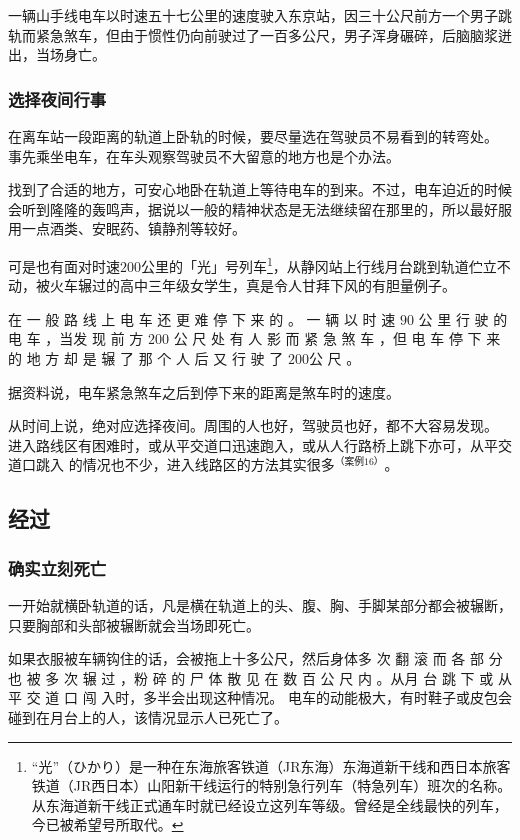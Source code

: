 \documentclass[UTF8]{ctexart}
\begin{document}
一辆山手线电车以时速五十七公里的速度驶入东京站，因三十公尺前方一个男子跳轨而紧急煞车，但由于惯性仍向前驶过了一百多公尺，男子浑身碾碎，后脑脑浆迸出，当场身亡。

\subsubsection*{选择夜间行事}

在离车站一段距离的轨道上卧轨的时候，要尽量选在驾驶员不易看到的转弯处。
事先乘坐电车，在车头观察驾驶员不大留意的地方也是个办法。

找到了合适的地方，可安心地卧在轨道上等待电车的到来。不过，电车迫近的时候会听到隆隆的轰鸣声，据说以一般的精神状态是无法继续留在那里的，所以最好服用一点酒类、安眠药、镇静剂等较好。

可是也有面对时速$200$公里的「光」号列车\footnote{“光”（ひかり）是一种在东海旅客铁道（JR东海）东海道新干线和西日本旅客铁道（JR西日本）山阳新干线运行的特别急行列车（特急列车）班次的名称。从东海道新干线正式通车时就已经设立这列车等级。曾经是全线最快的列车，今已被希望号所取代。}，从静冈站上行线月台跳到轨道伫立不动，被火车辗过的高中三年级女学生，真是令人甘拜下风的有胆量例子。

在 一 般 路 线 上 电 车 还 更 难 停 下 来 的 。
一 辆 以 时 速 $90$ 公 里 行 驶 的 电 车 ，当发 现 前 方 $200$ 公 尺 处 有 人 影 而 紧 急 煞 车 ，但 电 车 停 下 来 的 地 方 却 是 辗 了 那 个 人 后 又 行 驶 了 $200$公 尺 。

据资料说，电车紧急煞车之后到停下来的距离是煞车时的速度。

从时间上说，绝对应选择夜间。周围的人也好，驾驶员也好，都不大容易发现。 
进入路线区有困难时，或从平交道口迅速跑入，或从人行路桥上跳下亦可，从平交道口跳入 的情况也不少，进入线路区的方法其实很多$^{（案例 16）}$。

\subsection{经过}

\subsubsection*{确实立刻死亡}

一开始就横卧轨道的话，凡是横在轨道上的头、腹、胸、手脚某部分都会被辗断，只要胸部和头部被辗断就会当场即死亡。

如果衣服被车辆钩住的话，会被拖上十多公尺，然后身体多 次 翻 滚 而 各 部 分 也 被 多 次 辗 过 ，粉 碎 的 尸 体 散 见 在 数 百 公 尺 内 。从月 台 跳 下 或 从 平 交 道 口 闯 入时，多半会出现这种情况。 电车的动能极大，有时鞋子或皮包会碰到在月台上的人，该情况显示人已死亡了。
\end{document}
